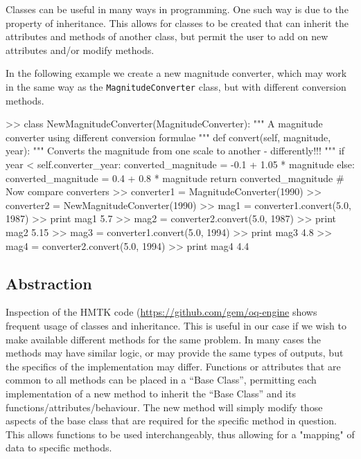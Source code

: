 Classes can be useful in many ways in programming. One such way is due to the property of inheritance. This allows for classes to be created that can inherit the attributes and methods of another class, but permit the user to add on new attributes and/or modify methods. 

In the following example we create a new magnitude converter, which may work in the same way as the \verb=MagnitudeConverter= class, but with different conversion methods.

\begin{python}[frame=single]
>> class NewMagnitudeConverter(MagnitudeConverter):
       """
       A magnitude converter using different conversion
       formulae
       """
       def convert(self, magnitude, year):
           """
           Converts the magnitude from one scale to another
           - differently!!!
           """
           if year < self.converter_year:
               converted_magnitude = -0.1 + 1.05 * magnitude
           else:
               converted_magnitude = 0.4 + 0.8 * magnitude
           return converted_magnitude
# Now compare converters
>> converter1 = MagnitudeConverter(1990)
>> converter2 = NewMagnitudeConverter(1990)
>> mag1 = converter1.convert(5.0, 1987)
>> print mag1
5.7
>> mag2 = converter2.convert(5.0, 1987)
>> print mag2
5.15
>> mag3 = converter1.convert(5.0, 1994)
>> print mag3
4.8
>> mag4 = converter2.convert(5.0, 1994)
>> print mag4
4.4    
\end{python}

\subsection{Abstraction}

Inspection of the HMTK code (\href{https://github.com/gem/oq-engine}{https://github.com/gem/oq-engine} shows frequent usage of classes and inheritance. This is useful in our case if we wish to make available different methods for the same problem. In many cases the methods may have similar logic, or may provide the same types of outputs, but the specifics of the implementation may differ. Functions or attributes that are common to all methods can be placed in a ``Base Class'', permitting each implementation of a new method to inherit the ``Base Class'' and its functions/attributes/behaviour. The new method will simply modify those aspects of the base class that are required for the specific method in question. This allows functions to be used interchangeably, thus allowing for a "mapping" of data to specific methods. 

